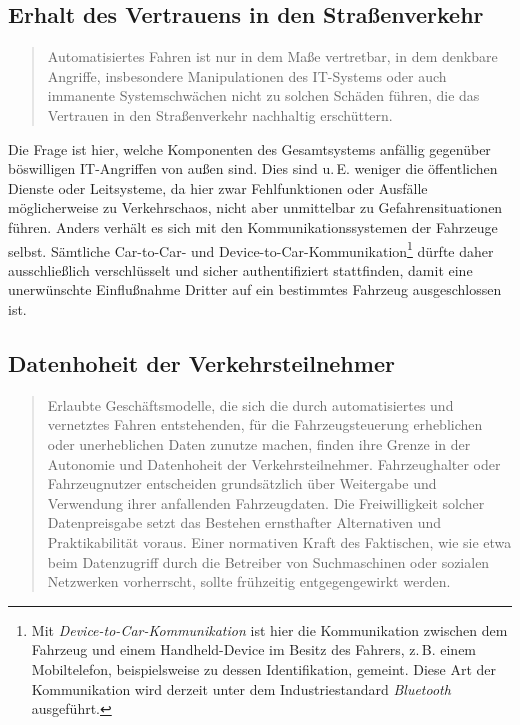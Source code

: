 \documentclass[twoside,a4paper,12pt]{article}
\begin{document}
\subsection{Erhalt des Vertrauens in den Straßenverkehr} \label{ErhaltDesVertrauensInDenStrassenverkehr}

\begin{quote}
\glqq
Automatisiertes Fahren ist nur in dem Maße vertretbar, in dem denkbare Angriffe, insbesondere Manipulationen des 
IT-Systems oder auch immanente Systemschwächen nicht
zu solchen Schäden führen, die das Vertrauen in den Straßenverkehr nachhaltig erschüttern.\grqq\mbox{~\cite[S. 12]{ek}}
\end{quote}

Die Frage ist hier, welche Komponenten des Gesamtsystems anfällig gegenüber böswilligen IT-Angriffen von außen sind. Dies sind u.\,E. weniger 
die öffentlichen Dienste oder Leitsysteme, da hier zwar Fehlfunktionen oder Ausfälle möglicherweise zu Verkehrschaos, nicht aber unmittelbar zu 
Gefahrensituationen führen. Anders verhält es sich
mit den Kommunikationssystemen der Fahrzeuge selbst. Sämtliche Car-to-Car- und Device-to-Car-Kommunikation\footnote{Mit \textit{Device-to-Car-Kommunikation} 
ist hier die Kommunikation zwischen dem Fahrzeug und einem Handheld-Device im Besitz des Fahrers, z.\,B. einem Mobiltelefon, beispielsweise zu dessen
Identifikation, gemeint. Diese Art der Kommunikation wird derzeit unter dem Industriestandard \textit{Bluetooth}~\cite{bt} ausgeführt.} dürfte daher ausschließlich verschlüsselt 
und sicher authentifiziert stattfinden, damit eine unerwünschte Einflußnahme Dritter auf ein bestimmtes Fahrzeug ausgeschlossen ist.

\subsection{Datenhoheit der Verkehrsteilnehmer} \label{DatenhoheitDerVerkehrsteilnehmer}

\begin{quote}
\glqq
Erlaubte Geschäftsmodelle, die sich die durch automatisiertes und vernetztes Fahren entstehenden, für die Fahrzeugsteuerung 
erheblichen oder unerheblichen Daten zunutze
machen, finden ihre Grenze in der Autonomie und Datenhoheit der Verkehrsteilnehmer.
Fahrzeughalter oder Fahrzeugnutzer entscheiden grundsätzlich über Weitergabe und
Verwendung ihrer anfallenden Fahrzeugdaten. Die Freiwilligkeit solcher Datenpreisgabe
setzt das Bestehen ernsthafter Alternativen und Praktikabilität voraus. Einer normativen
Kraft des Faktischen, wie sie etwa beim Datenzugriff durch die Betreiber von Suchmaschinen oder sozialen Netzwerken vorherrscht, 
sollte frühzeitig entgegengewirkt werden.\grqq\mbox{~\cite[S. 12]{ek}}
\end{quote}
\end{document}
